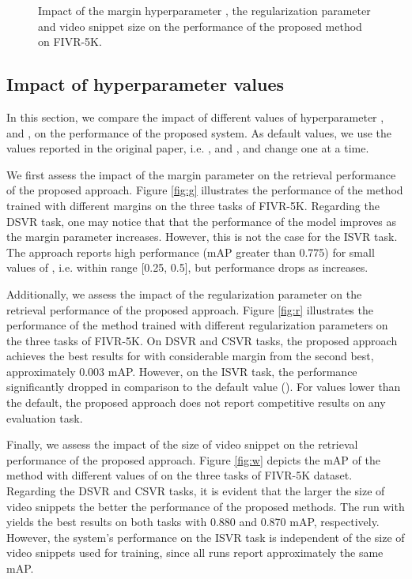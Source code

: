 \documentclass[10pt,twocolumn,letterpaper]{article}
\begin{document}
\begin{figure*}[t]
\centering
{}\hspace{0.1cm}
\hspace{0.1cm}
\caption{Impact of the margin hyperparameter , the regularization parameter  and video snippet size  on the performance of the proposed method on FIVR-5K.}
\label{fig:fivr_pr_curves}
\end{figure*}

\subsection{Impact of hyperparameter values}
In this section, we compare the impact of different values of hyperparameter ,  and , on the performance of the proposed system. As default values, we use the values reported in the original paper, i.e. ,  and , and change one at a time.

We first assess the impact of the margin parameter  on the retrieval performance of the proposed approach. Figure \ref{fig:g} illustrates the performance of the method trained with different margins on the three tasks of FIVR-5K. Regarding the DSVR task, one may notice that that the performance of the model improves as the margin parameter increases. However, this is not the case for the ISVR task. The approach reports high performance (mAP greater than 0.775) for small values of , i.e. within range [0.25, 0.5], but performance drops as  increases.



Additionally, we assess the impact of the regularization parameter  on the retrieval performance of the proposed approach. Figure \ref{fig:r} illustrates the performance of the method trained with different regularization parameters on the three tasks of FIVR-5K. On DSVR and CSVR tasks, the proposed approach achieves the best results for  with considerable margin from the second best, approximately 0.003 mAP. However, on the ISVR task, the performance significantly dropped in comparison to the default value (). For values lower than the default, the proposed approach does not report competitive results on any evaluation task.




Finally, we assess the impact of the size of video snippet  on the retrieval performance of the proposed approach. Figure \ref{fig:w} depicts the mAP of the method with different values of  on the three tasks of FIVR-5K dataset. Regarding the DSVR and CSVR tasks, it is evident that the larger the size of video snippets  the better the performance of the proposed methods. The run with  yields the best results on both tasks with 0.880 and 0.870 mAP, respectively. However, the system's performance on the ISVR task is independent of the size of video snippets used for training, since all runs report approximately the same mAP.
\end{document}
